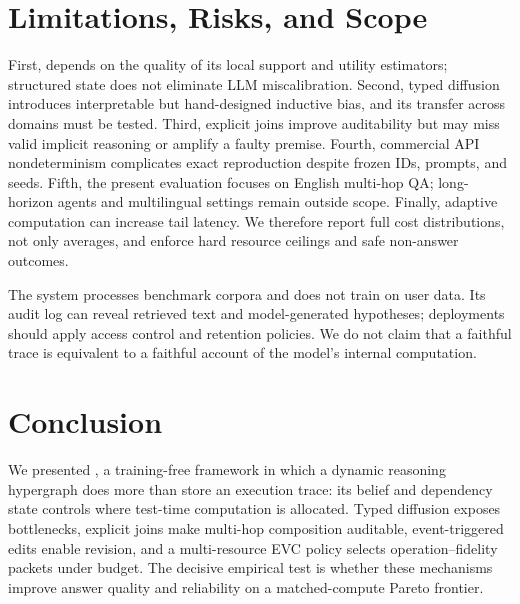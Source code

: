 \section{Limitations, Risks, and Scope}

First, \method{} depends on the quality of its local support and utility estimators; structured state does not eliminate LLM miscalibration. Second, typed diffusion introduces interpretable but hand-designed inductive bias, and its transfer across domains must be tested. Third, explicit joins improve auditability but may miss valid implicit reasoning or amplify a faulty premise. Fourth, commercial API nondeterminism complicates exact reproduction despite frozen IDs, prompts, and seeds. Fifth, the present evaluation focuses on English multi-hop QA; long-horizon agents and multilingual settings remain outside scope. Finally, adaptive computation can increase tail latency. We therefore report full cost distributions, not only averages, and enforce hard resource ceilings and safe non-answer outcomes.

The system processes benchmark corpora and does not train on user data. Its audit log can reveal retrieved text and model-generated hypotheses; deployments should apply access control and retention policies. We do not claim that a faithful trace is equivalent to a faithful account of the model's internal computation.

\section{Conclusion}

We presented \method{}, a training-free framework in which a dynamic reasoning hypergraph does more than store an execution trace: its belief and dependency state controls where test-time computation is allocated. Typed diffusion exposes bottlenecks, explicit joins make multi-hop composition auditable, event-triggered edits enable revision, and a multi-resource EVC policy selects operation--fidelity packets under budget. The decisive empirical test is whether these mechanisms improve answer quality and reliability on a matched-compute Pareto frontier. 

